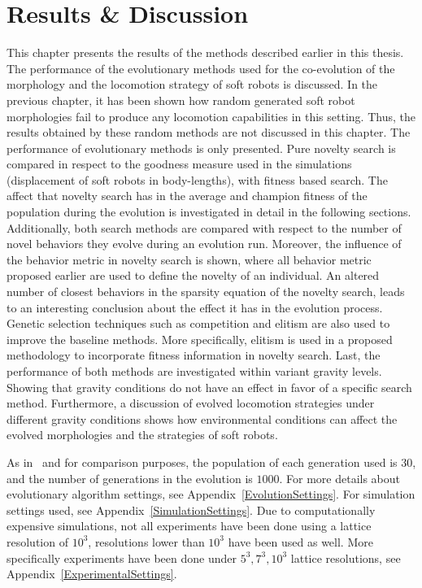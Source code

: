 
\chapter{Results \& Discussion} %

\label{Results} %


This chapter presents the results of the methods described earlier in this thesis. The performance of the evolutionary methods used for the co-evolution of the morphology and the locomotion strategy of soft robots is discussed. In the previous chapter, it has been shown how random generated soft robot morphologies fail to produce any locomotion capabilities in this setting. Thus, the results obtained by these random methods are not discussed in this chapter. The performance of evolutionary methods is only presented. Pure novelty search is compared in respect to the goodness measure used in the simulations (displacement of soft robots in body-lengths), with fitness based search. The affect that novelty search has in the average and champion fitness of the population during the evolution is investigated in detail in the following sections. Additionally, both search methods are compared with respect to the number of novel behaviors they evolve during an evolution run. Moreover, the influence of the behavior metric in novelty search is shown, where all behavior metric proposed earlier are used to define the novelty of an individual. An altered number of closest behaviors in the sparsity equation of the novelty search, leads to an interesting conclusion about the effect it has in the evolution process. Genetic selection techniques such as competition and elitism are also used to improve the baseline methods. More specifically, elitism is used in a proposed methodology to incorporate fitness information in novelty search. Last, the performance of both methods are investigated within variant gravity levels. Showing that gravity conditions do not have an effect in favor of a specific search method. Furthermore, a discussion of evolved locomotion strategies under different gravity conditions shows how environmental conditions can affect the evolved morphologies and the strategies of soft robots.

As in~\citep{cheney2013unshackling} and for comparison purposes, the population of each generation used is $30$, and the number of generations in the evolution is $1000$. For more details about evolutionary algorithm settings, see Appendix~\ref{EvolutionSettings}. For simulation settings used, see Appendix~\ref{SimulationSettings}. Due to computationally expensive simulations, not all experiments have been done using a lattice resolution of $10^3$, resolutions lower than $10^3$ have been used as well. More specifically experiments have been done under $5^3, 7^3, 10^3$ lattice resolutions, see Appendix~\ref{ExperimentalSettings}.



